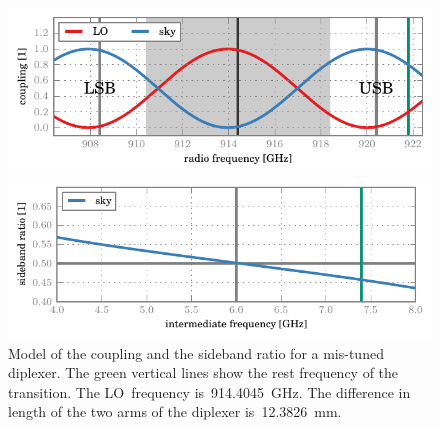 \begin{figure}
    \centering
    \includegraphics{diplexer_coupling_0503}
    \caption*{
        Coupling of the mixer by the LO and the sky for a mis-tuned diplexer.
        In this specific case, the coupling is shifted \SI{53}{\mega\hertz} to the left of its optimal position.
    }
    \bigskip
    \includegraphics{diplexer_sbr_0503}
    \caption*{
        Sideband ratio of the mixer--sky coupling for a mis-tuned diplexer.
        The left part of the spectrum is USB-dominated, the right part is LSB-dominated.
        The intensity of the  line is underestimated by about~\SI{10}{\percent}.
    }
    \caption{
    Model of the coupling and the sideband ratio for a mis-tuned diplexer.
    The green vertical lines show the rest frequency of the  transition.
    The LO~frequency is~\SI{914.4045}{\giga\hertz}.
    The difference in length of the two arms of the diplexer is~\SI{12.3826}{\milli\meter}.
    }
    \label{fig:diplexer_0503}
\end{figure}

